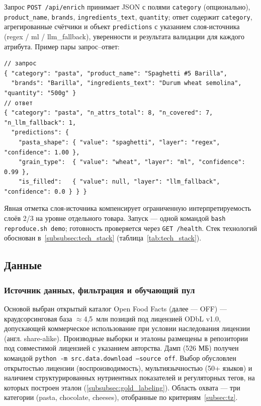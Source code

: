 Запрос \texttt{POST /api/enrich} принимает JSON с полями \texttt{category} (опционально), \texttt{product\_name}, \texttt{brands}, \texttt{ingredients\_text}, \texttt{quantity}; ответ содержит \texttt{category}, агрегированные счётчики и объект \texttt{predictions} с указанием слоя-источника (regex / ml / llm\_fallback), уверенности и результата валидации для каждого атрибута. Пример пары запрос–ответ:

\begin{lstlisting}[breaklines=true, breakatwhitespace=false,
  basicstyle=\small\ttfamily, columns=fullflexible]
// запрос
{ "category": "pasta", "product_name": "Spaghetti #5 Barilla",
  "brands": "Barilla", "ingredients_text": "Durum wheat semolina", "quantity": "500g" }
// ответ
{ "category": "pasta", "n_attrs_total": 8, "n_covered": 7, "n_llm_fallback": 1,
  "predictions": {
    "pasta_shape": { "value": "spaghetti", "layer": "regex", "confidence": 1.00 },
    "grain_type":  { "value": "wheat", "layer": "ml", "confidence": 0.99 },
    "is_filled":   { "value": null, "layer": "llm_fallback", "confidence": 0.0 } } }
\end{lstlisting}

Явная отметка слоя-источника компенсирует ограниченную интерпретируемость слоёв 2/3 на уровне отдельного товара. Запуск — одной командой \texttt{bash reproduce.sh demo}; готовность проверяется через \texttt{GET /health}. Стек технологий обоснован в~\ref{subsubsec:tech_stack} (таблица~\ref{tab:tech_stack}).

\subsection{Данные}
\label{subsec:data}

\subsubsection{Источник данных, фильтрация и обучающий пул}
\label{subsubsec:data_source}

Основой выбран открытый каталог Open Food Facts (далее — OFF) \cite{ref_13} — краудсорсинговая база $\approx$4,5~млн позиций под лицензией ODbL v1.0, допускающей коммерческое использование при условии наследования лицензии (англ. share-alike). Производные выборки и эталоны размещены в репозитории под совместимой лицензией с указанием авторства. Дамп (526 МБ) получен командой \texttt{python -m src.data.download --source off}. Выбор обусловлен открытостью лицензии (воспроизводимость), мультиязычностью (50+ языков) и наличием структурированных нутриентных показателей и регуляторных тегов, на которых построен эталон (\ref{subsubsec:gold_labeling}). Область охвата — три категории (pasta, chocolate, cheeses), отобранные по критериям~\ref{subsec:tz}.

